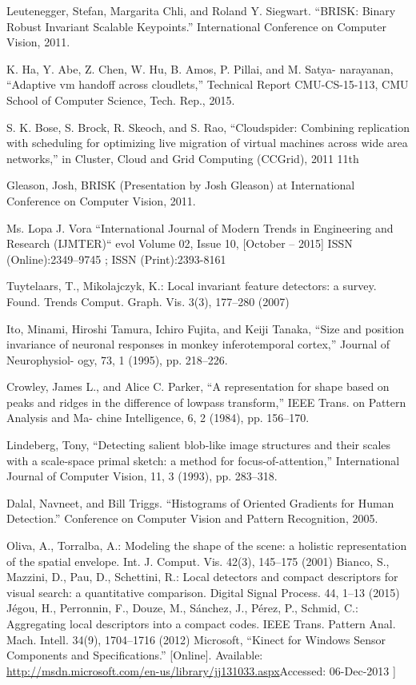 \documentclass{report}           %
\begin{document}
\begin{thebibliography}{60}
Leutenegger, Stefan, Margarita Chli, and Roland Y. Siegwart. “BRISK: Binary Robust
Invariant Scalable Keypoints.” International Conference on Computer Vision, 2011.

 K. Ha, Y. Abe, Z. Chen, W. Hu, B. Amos, P. Pillai, and M. Satya- narayanan, “Adaptive vm handoff across cloudlets,” Technical Report CMU-CS-15-113, CMU School of Computer Science, Tech. Rep., 2015.

 S. K. Bose, S. Brock, R. Skeoch, and S. Rao, “Cloudspider: Combining replication with scheduling for optimizing live migration of virtual machines across wide area networks,” in Cluster, Cloud and Grid Computing (CCGrid), 2011 11th

  Gleason, Josh, BRISK (Presentation by Josh Gleason) at International Conference on
Computer Vision, 2011.

  Ms. Lopa J. Vora “International Journal of Modern Trends in Engineering and Research (IJMTER)“ evol Volume 02, Issue 10, [October – 2015] ISSN (Online):2349–9745 ; ISSN (Print):2393-8161

 Tuytelaars, T., Mikolajczyk, K.: Local invariant feature detectors: a survey. Found. Trends
Comput. Graph. Vis. 3(3), 177–280 (2007)

  Ito, Minami, Hiroshi Tamura, Ichiro Fujita, and Keiji
Tanaka, “Size and position invariance of neuronal responses
in monkey inferotemporal cortex,”
Journal of Neurophysiol-
ogy, 73, 1 (1995), pp. 218–226.


 Crowley, James L., and Alice C. Parker, “A representation
for shape based on peaks and ridges in the difference of lowpass
transform,”
IEEE Trans. on Pattern Analysis and Ma-
chine Intelligence,
6, 2 (1984), pp. 156–170.

Lindeberg, Tony, “Detecting salient blob-like image structures and their scales with a scale-space primal sketch:
a method for focus-of-attention,”
International Journal of
Computer Vision,
11, 3 (1993), pp. 283–318.


  Dalal, Navneet, and Bill Triggs. “Histograms of Oriented Gradients for Human
Detection.” Conference on Computer Vision and Pattern Recognition, 2005.


 Oliva, A., Torralba, A.: Modeling the shape of the scene: a holistic representation of the spatial
envelope. Int. J. Comput. Vis. 42(3), 145–175 (2001)
 Bianco, S., Mazzini, D., Pau, D., Schettini, R.: Local detectors and compact descriptors for
visual search: a quantitative comparison. Digital Signal Process. 44, 1–13 (2015)
 Jégou, H., Perronnin, F., Douze, M., Sánchez, J., Pérez, P., Schmid, C.: Aggregating local
descriptors into a compact codes. IEEE Trans. Pattern Anal. Mach. Intell. 34(9), 1704–1716
(2012)
Microsoft, “Kinect for Windows Sensor Components and Specifications.” [Online]. Available: \url{http://msdn.microsoft.com/en-us/library/jj131033.aspx}Accessed: 06-Dec-2013 ]


\end{thebibliography}
\end{document}
